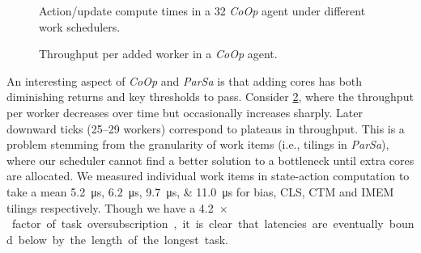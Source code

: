 \documentclass[
sigconf,natbib=false
]{acmart}
\newcommand{\Coopfw}{\emph{CoOp}}
\begin{document}
\begin{figure}
	\caption{Action/update compute times in a \SI{32}{\bit} \Coopfw{} agent under different work schedulers.\label{fig:work-alloc-32}}
\end{figure}

\begin{figure}
	\caption{Throughput per added worker in a \Coopfw{} agent.\label{fig:tput-per-core}}
\end{figure}

An interesting aspect of \Coopfw{} and \emph{ParSa} is that adding cores has both diminishing returns and key thresholds to pass.
Consider \cref{fig:tput-per-core}, where the throughput per worker decreases over time but occasionally increases sharply.
Later downward ticks (\numrange{25}{29} workers) correspond to plateaus in throughput.
This is a problem stemming from the granularity of work items (i.e., tilings in \emph{ParSa}), where our scheduler cannot find a better solution to a bottleneck until extra cores are allocated.
We measured individual work items in state-action computation to take a mean \SIlist{5.2; 6.2; 9.7; 11.0}{\micro\second} for bias, CLS, CTM and IMEM tilings respectively.
Though we have a \SI{4.2}{$\times$} factor of task oversubscription, it is clear that latencies are eventually bound below by the length of the longest task.
\end{document}
